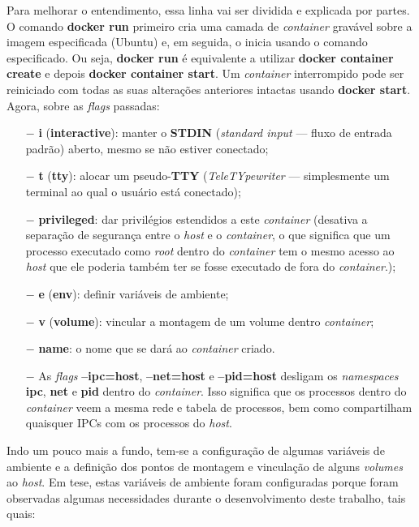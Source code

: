 \documentclass[
  12pt,				%
  openright,			%
  twoside,			%
  a4paper,			%
  english,			%
  french,				%
  spanish,			%
  brazil,				%
  ]{abntex2}
\begin{document}
Para melhorar o entendimento, essa linha vai ser dividida e explicada por partes. O comando \textbf{docker run} primeiro cria uma camada de \textit{container}
gravável sobre a imagem especificada (Ubuntu) e, em seguida, o inicia usando o comando especificado. Ou seja, \textbf{docker run} é equivalente a utilizar
\textbf{docker container create} e depois \textbf{docker container start}. Um \textit{container} interrompido pode ser reiniciado com todas as suas alterações anteriores
intactas usando \textbf{docker start}. Agora, sobre as \textit{flags} passadas:

\begin{itemize}
  \item[$-$] \textbf{i} (\textbf{interactive}): manter o \textbf{STDIN} (\textit{standard input} — fluxo de entrada padrão) aberto, mesmo se não estiver conectado;
  \item[$-$] \textbf{t} (\textbf{tty}): alocar um pseudo-\textbf{TTY} (\textit{TeleTYpewriter} — simplesmente um terminal ao qual o usuário está conectado);
  \item[$-$] \textbf{privileged}: dar privilégios estendidos a este \textit{container} (desativa a separação de segurança entre o \textit{host} e o
        \textit{container}, o que significa que um processo executado como \textit{root} dentro do \textit{container} tem o mesmo acesso ao \textit{host}
        que ele poderia também ter se fosse executado de fora do \textit{container}.);
  \item[$-$] \textbf{e} (\textbf{env}): definir variáveis de ambiente;
  \item[$-$] \textbf{v} (\textbf{volume}): vincular a montagem de um volume dentro \textit{container};
  \item[$-$] \textbf{name}: o nome que se dará ao \textit{container} criado.
  \item[$-$] As \textit{flags} \textbf{--ipc=host}, \textbf{--net=host} e \textbf{--pid=host} desligam os \textit{namespaces} \textbf{ipc},
        \textbf{net} e \textbf{pid} dentro do \textit{container}. Isso significa que os processos dentro do \textit{container} veem a mesma rede e
        tabela de processos, bem como compartilham quaisquer IPCs \cite{Rusling-IPC:1999} com os processos do \textit{host}.
\end{itemize}

Indo um pouco mais a fundo, tem-se a configuração de algumas variáveis de ambiente e a definição dos pontos de montagem e vinculação de alguns
\textit{volumes} ao \textit{host}. Em tese, estas variáveis de ambiente foram configuradas porque foram observadas algumas necessidades durante o
desenvolvimento deste trabalho, tais quais:
\end{document}
